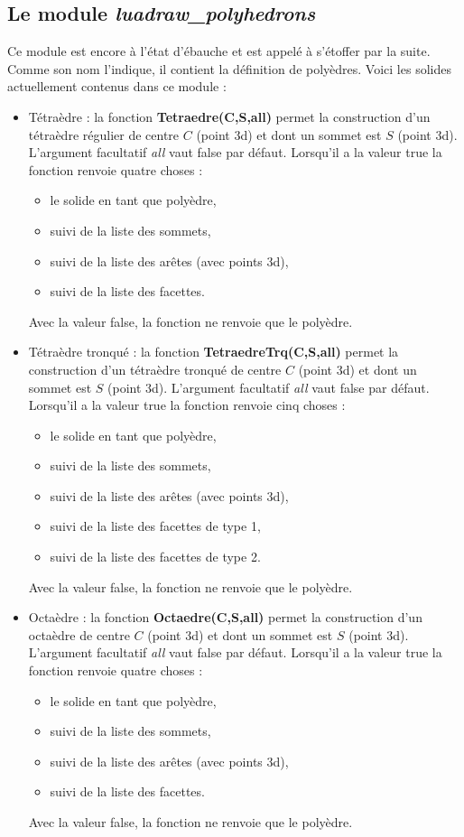 \subsection{Le module \emph{luadraw\_polyhedrons}}

Ce module est encore à l'état d'ébauche et est appelé à s'étoffer par la suite. Comme son nom l'indique, il contient la définition de polyèdres. Voici les solides actuellement contenus dans ce module :

\begin{itemize}
    \item Tétraèdre : la fonction \textbf{Tetraedre(C,S,all)} permet la construction d'un tétraèdre régulier de centre $C$ (point 3d) et dont un sommet est $S$ (point 3d). L'argument facultatif \emph{all} vaut false par défaut. Lorsqu'il a la valeur true la fonction renvoie quatre choses :
    \begin{itemize}
        \item le solide en tant que polyèdre,
        \item suivi de la liste des sommets,
        \item suivi de la liste des arêtes (avec points 3d),
        \item suivi de la liste des facettes.
    \end{itemize}
Avec la valeur false, la fonction ne renvoie que le polyèdre.


\item Tétraèdre tronqué : la fonction \textbf{TetraedreTrq(C,S,all)} permet la construction d'un tétraèdre tronqué de centre $C$ (point 3d) et dont un sommet est $S$ (point 3d). L'argument facultatif \emph{all} vaut false par défaut. Lorsqu'il a la valeur true la fonction renvoie cinq choses :
    \begin{itemize}
        \item le solide en tant que polyèdre,
        \item suivi de la liste des sommets,
        \item suivi de la liste des arêtes (avec points 3d),
        \item suivi de la liste des facettes de type 1,
        \item suivi de la liste des facettes de type 2.
    \end{itemize}
Avec la valeur false, la fonction ne renvoie que le polyèdre.

\item Octaèdre : la fonction \textbf{Octaedre(C,S,all)} permet la construction d'un octaèdre de centre $C$ (point 3d) et dont un sommet est $S$ (point 3d). L'argument facultatif \emph{all} vaut false par défaut. Lorsqu'il a la valeur true la fonction renvoie quatre choses :
    \begin{itemize}
        \item le solide en tant que polyèdre,
        \item suivi de la liste des sommets,
        \item suivi de la liste des arêtes (avec points 3d),
        \item suivi de la liste des facettes.
    \end{itemize}
Avec la valeur false, la fonction ne renvoie que le polyèdre.


\end{itemize}

